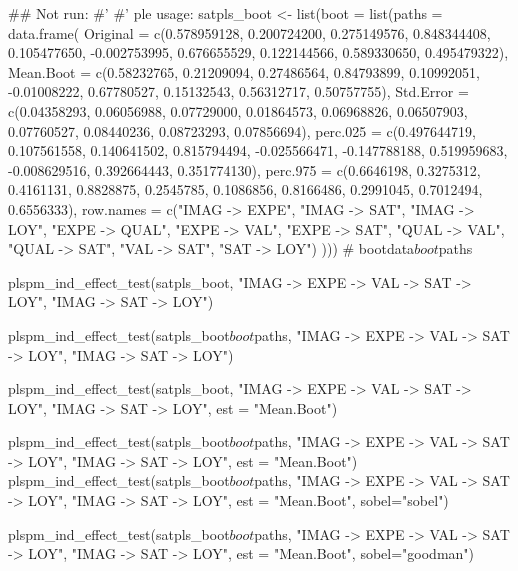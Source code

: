 \documentclass[a4paper]{book}
\begin{document}
\begin{Examples}
\begin{ExampleCode}

\#\# Not run: 
#'
#'
ple usage:
  satpls_boot <- list(boot = list(paths = data.frame(
    Original = c(0.578959128, 0.200724200, 0.275149576, 0.848344408,
                 0.105477650, -0.002753995, 0.676655529, 0.122144566, 0.589330650, 0.495479322),
    Mean.Boot = c(0.58232765, 0.21209094, 0.27486564, 0.84793899,
                  0.10992051, -0.01008222, 0.67780527, 0.15132543, 0.56312717, 0.50757755),
    Std.Error = c(0.04358293, 0.06056988, 0.07729000, 0.01864573,
                  0.06968826, 0.06507903, 0.07760527, 0.08440236, 0.08723293, 0.07856694),
    perc.025 = c(0.497644719, 0.107561558, 0.140641502, 0.815794494,
                 -0.025566471, -0.147788188, 0.519959683, -0.008629516, 0.392664443, 0.351774130),
    perc.975 = c(0.6646198, 0.3275312, 0.4161131, 0.8828875,
                 0.2545785, 0.1086856, 0.8166486, 0.2991045, 0.7012494, 0.6556333),
    row.names = c("IMAG -> EXPE", "IMAG -> SAT", "IMAG -> LOY",
                  "EXPE -> QUAL", "EXPE -> VAL", "EXPE -> SAT",
                  "QUAL -> VAL", "QUAL -> SAT", "VAL -> SAT", "SAT -> LOY")
  )))
  # bootdata$boot$paths




  plspm_ind_effect_test(satpls_boot,
                      "IMAG -> EXPE -> VAL -> SAT -> LOY",
                      "IMAG -> SAT -> LOY")

  plspm_ind_effect_test(satpls_boot$boot$paths,
                        "IMAG -> EXPE -> VAL -> SAT -> LOY",
                        "IMAG -> SAT -> LOY")

  plspm_ind_effect_test(satpls_boot,
                      "IMAG -> EXPE -> VAL -> SAT -> LOY",
                      "IMAG -> SAT -> LOY", est = "Mean.Boot")

  plspm_ind_effect_test(satpls_boot$boot$paths,
                        "IMAG -> EXPE -> VAL -> SAT -> LOY",
                        "IMAG -> SAT -> LOY", est = "Mean.Boot")
  plspm_ind_effect_test(satpls_boot$boot$paths,
                        "IMAG -> EXPE -> VAL -> SAT -> LOY",
                        "IMAG -> SAT -> LOY",
                        est = "Mean.Boot",
                        sobel="sobel")

  plspm_ind_effect_test(satpls_boot$boot$paths,
                        "IMAG -> EXPE -> VAL -> SAT -> LOY",
                        "IMAG -> SAT -> LOY",
                        est = "Mean.Boot",
                        sobel="goodman")



\end{ExampleCode}
\end{Examples}
\end{document}
